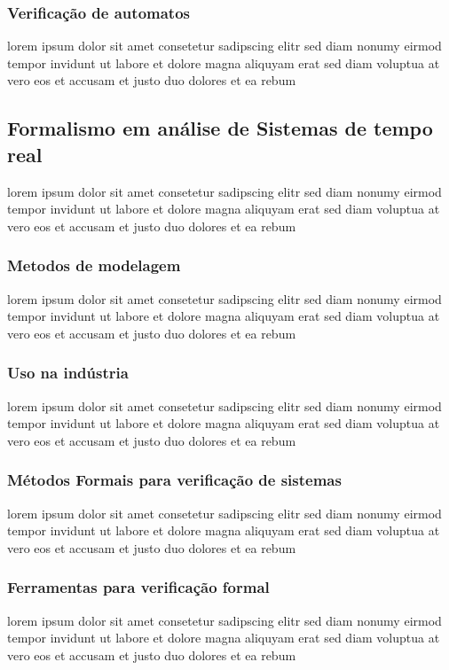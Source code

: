 \subsubsection{Verificação de automatos}
lorem ipsum dolor sit amet consetetur sadipscing elitr sed diam nonumy
eirmod tempor invidunt ut labore et dolore magna aliquyam erat sed diam
voluptua at vero eos et accusam et justo duo dolores et ea rebum


\subsection{Formalismo em análise de Sistemas de tempo real}
lorem ipsum dolor sit amet consetetur sadipscing elitr sed diam nonumy
eirmod tempor invidunt ut labore et dolore magna aliquyam erat sed diam
voluptua at vero eos et accusam et justo duo dolores et ea rebum

\subsubsection{Metodos de modelagem}
lorem ipsum dolor sit amet consetetur sadipscing elitr sed diam nonumy
eirmod tempor invidunt ut labore et dolore magna aliquyam erat sed diam
voluptua at vero eos et accusam et justo duo dolores et ea rebum

\subsubsection{Uso na indústria}
lorem ipsum dolor sit amet consetetur sadipscing elitr sed diam nonumy
eirmod tempor invidunt ut labore et dolore magna aliquyam erat sed diam
voluptua at vero eos et accusam et justo duo dolores et ea rebum

\subsubsection{Métodos Formais para verificação de sistemas}
lorem ipsum dolor sit amet consetetur sadipscing elitr sed diam nonumy
eirmod tempor invidunt ut labore et dolore magna aliquyam erat sed diam
voluptua at vero eos et accusam et justo duo dolores et ea rebum

\subsubsection{Ferramentas para verificação formal}
lorem ipsum dolor sit amet consetetur sadipscing elitr sed diam nonumy
eirmod tempor invidunt ut labore et dolore magna aliquyam erat sed diam
voluptua at vero eos et accusam et justo duo dolores et ea rebum
